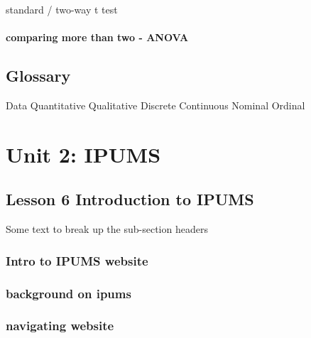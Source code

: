 \documentclass[
]{book}
\begin{document}
standard / two-way t test

\hypertarget{comparing-more-than-two---anova}{%
\subsubsection{comparing more than two - ANOVA}\label{comparing-more-than-two---anova}}

\hypertarget{glossary-2}{%
\section*{Glossary}\label{glossary-2}}

Data
Quantitative
Qualitative
Discrete
Continuous
Nominal
Ordinal

\hypertarget{unit-2-ipums}{%
\chapter*{Unit 2: IPUMS}\label{unit-2-ipums}}

\hypertarget{lesson-6-introduction-to-ipums}{%
\section*{Lesson 6 Introduction to IPUMS}\label{lesson-6-introduction-to-ipums}}

Some text to break up the sub-section headers

\hypertarget{intro-to-ipums-website}{%
\subsection*{Intro to IPUMS website}\label{intro-to-ipums-website}}

\hypertarget{background-on-ipums}{%
\subsection*{background on ipums}\label{background-on-ipums}}

\hypertarget{navigating-website}{%
\subsection*{navigating website}\label{navigating-website}}
\end{document}
